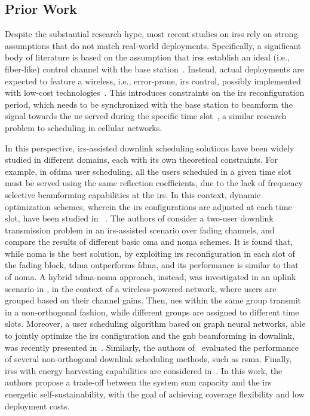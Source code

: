 \subsection{Prior Work}
Despite the substantial research hype, most recent studies on \glspl{irs} rely on strong assumptions that do not match real-world deployments.
Specifically, a significant body of literature is based on the assumption that \glspl{irs} establish an ideal (i.e., fiber-like) control channel with the base station~\cite{wu2020towards, abeywickrama2020intelligent, wu2019intelligent, pagin2022end}. Instead, actual deployments are expected to feature a wireless, i.e., error-prone, \gls{irs} control, possibly implemented with low-cost technologies~\cite{liu2022path, liaskos2018realizing}. 
This introduces constraints on the \gls{irs} reconfiguration period, which needs to be synchronized with the base station to beamform the signal towards the \gls{ue} served during the specific time slot~\cite{flamini2022towards}, a similar research problem to scheduling in cellular networks. 

In this perspective, \gls{irs}-assisted downlink scheduling solutions have been widely studied in different domains, each with its own theoretical constraints.
For example, in \gls{ofdma} user scheduling, all the users scheduled in a given time slot must be served using the same reflection coefficients, due to the lack of frequency selective beamforming capabilities at the \gls{irs}. In this context, dynamic optimization schemes, wherein the \gls{irs} configurations are adjusted at each time slot, have been studied in ~\cite{Yang20IRS, Lee23Harmony}.
The authors of \cite{guo2021intelligent} consider a two-user downlink transmission problem in an \gls{irs}-assisted scenario over fading channels, and compare the results of different basic \gls{oma} and \gls{noma} schemes. It is found that, while \gls{noma} is the best solution, by exploiting \gls{irs} reconfiguration in each slot of the fading block, \gls{tdma} outperforms \gls{fdma}, and its performance is similar to that of \gls{noma}.
A hybrid \gls{tdma}-\gls{noma} approach, instead, was investigated in
an uplink scenario in \cite{zhang2021throughput, alobiedollah2023self}, in the context of a wireless-powered network, where users are grouped based on their channel gains. 
Then, \glspl{ue} within the same group transmit in a non-orthogonal fashion, while different groups are assigned to different time slots.
Moreover, a user scheduling algorithm based on graph neural networks, able to jointly optimize the \gls{irs} configuration and the \gls{gnb} beamforming in downlink, was recently presented in~\cite{Zhang22Learning}. 
Similarly, the authors of~\cite{Bansal21Rate, Fu21Resource, Zhuo22Partial} evaluated the performance of several non-orthogonal downlink scheduling methods, such as \gls{rsma}.
Finally, \glspl{irs} with energy harvesting capabilities are considered in~\cite{hu2021robust}. In this work, the authors propose a trade-off between the system sum capacity and the \gls{irs} energetic self-sustainability, with the goal of achieving coverage flexibility and low deployment costs.

